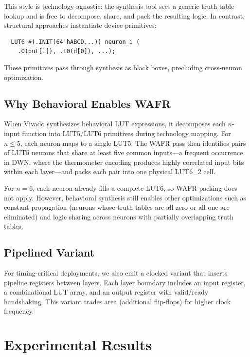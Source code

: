 \documentclass[conference]{IEEEtran}
\begin{document}
\noindent This style is technology-agnostic: the synthesis tool sees a generic truth table lookup and is free to decompose, share, and pack the resulting logic.
In contrast, structural approaches instantiate device primitives:

\begin{verbatim}
  LUT6 #(.INIT(64'hABCD...)) neuron_i (
    .O(out[i]), .I0(d[0]), ...);
\end{verbatim}

\noindent These primitives pass through synthesis as black boxes, precluding cross-neuron optimization.

\subsection{Why Behavioral Enables WAFR}

When Vivado synthesizes behavioral LUT expressions, it decomposes each $n$-input function into LUT5/LUT6 primitives during technology mapping.
For $n \leq 5$, each neuron maps to a single LUT5.
The WAFR pass then identifies pairs of LUT5 neurons that share at least five common inputs---a frequent occurrence in DWN, where the thermometer encoding produces highly correlated input bits within each layer---and packs each pair into one physical LUT6\_2 cell.

For $n = 6$, each neuron already fills a complete LUT6, so WAFR packing does not apply.
However, behavioral synthesis still enables other optimizations such as constant propagation (neurons whose truth tables are all-zero or all-one are eliminated) and logic sharing across neurons with partially overlapping truth tables.

\subsection{Pipelined Variant}

For timing-critical deployments, we also emit a clocked variant that inserts pipeline registers between layers.
Each layer boundary includes an input register, a combinational LUT array, and an output register with valid/ready handshaking.
This variant trades area (additional flip-flops) for higher clock frequency.


\section{Experimental Results}
\label{sec:results}
\end{document}
